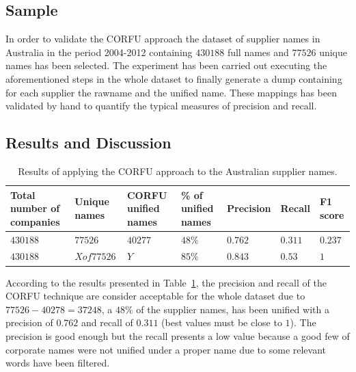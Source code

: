 \documentclass{llncs}
\begin{document}
\subsection{Sample}
In order to validate the CORFU approach the dataset of supplier names in Australia 
in the period 2004-2012 containing $430188$ full names 
and $77526$ unique names has been selected. The experiment has been 
carried out executing the aforementioned steps in the whole dataset 
to finally generate a dump containing for each supplier the 
rawname and the unified name. These mappings has been validated 
by hand to quantify the typical measures of precision and recall. 


\subsection{Results and Discussion}

\begin{table}[!h]
\renewcommand{\arraystretch}{1.3}
\begin{center}
\begin{tabular}{|p{2.5cm}|p{2cm}|p{1.5cm}|p{1.8cm}|l|l|l|}
\hline
  \textbf{Total number of companies} & \textbf{Unique names}& \textbf{CORFU unified names}& \textbf{\% of unified names} & \textbf{Precision} & \textbf{Recall} & \textbf{F1 score} \\  \hline
   $430188$ & $77526$ & $40277$  &$48\%$ & $0.762$ & $0.311$&$0.237$ \\ \hline   
   $430188$ & $X of 77526$ & $Y$ & $85\%$&  $0.843$ & $0.53$ &$1$\\ \hline
  \hline
  \end{tabular}
  \caption{Results of applying the CORFU approach to the Australian supplier names.}
  \label{tabla:aus-results}
  \end{center}
\end{table} 


According to the results presented in Table~\ref{tabla:aus-results}, the precision 
and recall of the CORFU technique are consider acceptable for the whole dataset 
due to $77526-40278=37248$, a $48\%$ of the supplier names, has been unified with 
a precision of $0.762$ and recall of $0.311$ (best values must be close to $1$). 
The precision is good enough but the recall presents a low value because a good few of 
corporate names were not unified under a proper name due to some relevant 
words have been filtered.
\end{document}
